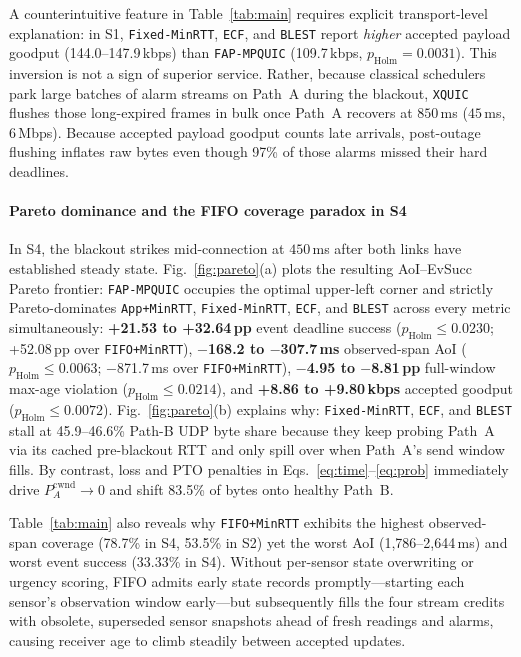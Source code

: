 \documentclass[preprint,12pt,number]{elsarticle}
\begin{document}
A counterintuitive feature in Table~\ref{tab:main} requires explicit transport-level explanation: in S1, \texttt{Fixed-MinRTT}, \texttt{ECF}, and \texttt{BLEST} report \emph{higher} accepted payload goodput (144.0--147.9\,kbps) than \texttt{FAP-MPQUIC} (109.7\,kbps, $p_{\text{Holm}} = 0.0031$). This inversion is not a sign of superior service. Rather, because classical schedulers park large batches of alarm streams on Path~A during the blackout, \texttt{XQUIC} flushes those long-expired frames in bulk once Path~A recovers at $850$\,ms ($45$\,ms, $6$\,Mbps). Because accepted payload goodput counts late arrivals, post-outage flushing inflates raw bytes even though 97\% of those alarms missed their hard deadlines.

\paragraph{Pareto dominance and the FIFO coverage paradox in S4}
In S4, the blackout strikes mid-connection at $450$\,ms after both links have established steady state. Fig.~\ref{fig:pareto}(a) plots the resulting AoI--EvSucc Pareto frontier: \texttt{FAP-MPQUIC} occupies the optimal upper-left corner and strictly Pareto-dominates \texttt{App+MinRTT}, \texttt{Fixed-MinRTT}, \texttt{ECF}, and \texttt{BLEST} across every metric simultaneously: \textbf{+21.53 to +32.64\,pp} event deadline success ($p_{\text{Holm}} \le 0.0230$; +52.08\,pp over \texttt{FIFO+MinRTT}), \textbf{$-$168.2 to $-$307.7\,ms} observed-span AoI ($p_{\text{Holm}} \le 0.0063$; $-$871.7\,ms over \texttt{FIFO+MinRTT}), \textbf{$-$4.95 to $-$8.81\,pp} full-window max-age violation ($p_{\text{Holm}} \le 0.0214$), and \textbf{+8.86 to +9.80\,kbps} accepted goodput ($p_{\text{Holm}} \le 0.0072$). Fig.~\ref{fig:pareto}(b) explains why: \texttt{Fixed-MinRTT}, \texttt{ECF}, and \texttt{BLEST} stall at 45.9--46.6\% Path-B UDP byte share because they keep probing Path~A via its cached pre-blackout RTT and only spill over when Path~A's send window fills. By contrast, loss and PTO penalties in Eqs.~\eqref{eq:time}--\eqref{eq:prob} immediately drive $P_A^{\text{cwnd}} \to 0$ and shift 83.5\% of bytes onto healthy Path~B.

Table~\ref{tab:main} also reveals why \texttt{FIFO+MinRTT} exhibits the highest observed-span coverage (78.7\% in S4, 53.5\% in S2) yet the worst AoI (1,786--2,644\,ms) and worst event success (33.33\% in S4). Without per-sensor state overwriting or urgency scoring, FIFO admits early state records promptly---starting each sensor's observation window early---but subsequently fills the four stream credits with obsolete, superseded sensor snapshots ahead of fresh readings and alarms, causing receiver age to climb steadily between accepted updates.
\end{document}
